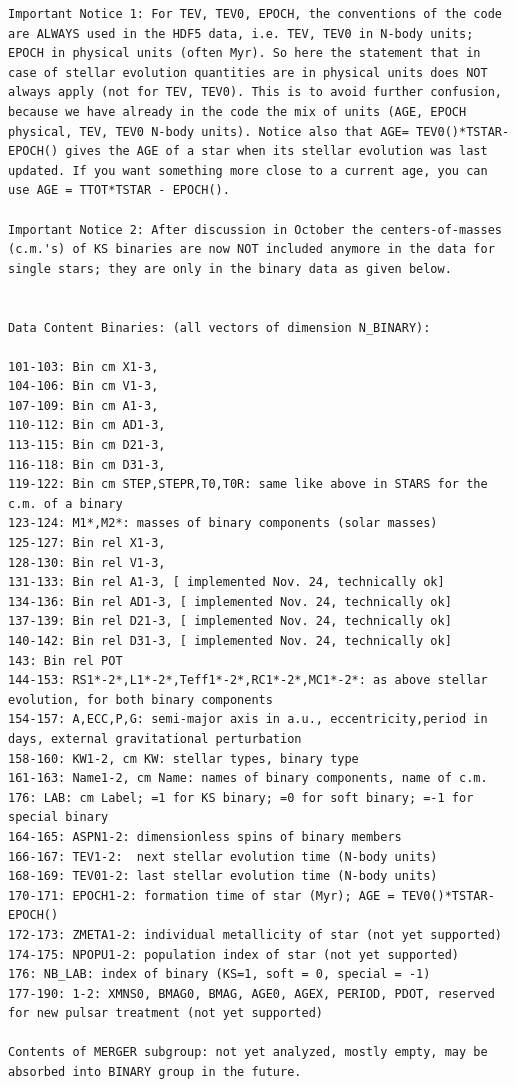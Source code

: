 \begin{lstlisting}[breaklines]
Important Notice 1: For TEV, TEV0, EPOCH, the conventions of the code are ALWAYS used in the HDF5 data, i.e. TEV, TEV0 in N-body units; EPOCH in physical units (often Myr). So here the statement that in case of stellar evolution quantities are in physical units does NOT always apply (not for TEV, TEV0). This is to avoid further confusion, because we have already in the code the mix of units (AGE, EPOCH physical, TEV, TEV0 N-body units). Notice also that AGE= TEV0()*TSTAR-EPOCH() gives the AGE of a star when its stellar evolution was last updated. If you want something more close to a current age, you can use AGE = TTOT*TSTAR - EPOCH().

Important Notice 2: After discussion in October the centers-of-masses (c.m.'s) of KS binaries are now NOT included anymore in the data for single stars; they are only in the binary data as given below.


Data Content Binaries: (all vectors of dimension N_BINARY):

101-103: Bin cm X1-3,
104-106: Bin cm V1-3,
107-109: Bin cm A1-3,
110-112: Bin cm AD1-3,
113-115: Bin cm D21-3,
116-118: Bin cm D31-3,
119-122: Bin cm STEP,STEPR,T0,T0R: same like above in STARS for the c.m. of a binary
123-124: M1*,M2*: masses of binary components (solar masses)
125-127: Bin rel X1-3,
128-130: Bin rel V1-3,
131-133: Bin rel A1-3, [ implemented Nov. 24, technically ok]
134-136: Bin rel AD1-3, [ implemented Nov. 24, technically ok]
137-139: Bin rel D21-3, [ implemented Nov. 24, technically ok]
140-142: Bin rel D31-3, [ implemented Nov. 24, technically ok]
143: Bin rel POT
144-153: RS1*-2*,L1*-2*,Teff1*-2*,RC1*-2*,MC1*-2*: as above stellar evolution, for both binary components
154-157: A,ECC,P,G: semi-major axis in a.u., eccentricity,period in days, external gravitational perturbation
158-160: KW1-2, cm KW: stellar types, binary type
161-163: Name1-2, cm Name: names of binary components, name of c.m.
176: LAB: cm Label; =1 for KS binary; =0 for soft binary; =-1 for special binary
164-165: ASPN1-2: dimensionless spins of binary members
166-167: TEV1-2:  next stellar evolution time (N-body units)
168-169: TEV01-2: last stellar evolution time (N-body units)
170-171: EPOCH1-2: formation time of star (Myr); AGE = TEV0()*TSTAR-EPOCH()
172-173: ZMETA1-2: individual metallicity of star (not yet supported)
174-175: NPOPU1-2: population index of star (not yet supported)
176: NB_LAB: index of binary (KS=1, soft = 0, special = -1)
177-190: 1-2: XMNS0, BMAG0, BMAG, AGE0, AGEX, PERIOD, PDOT, reserved for new pulsar treatment (not yet supported)

Contents of MERGER subgroup: not yet analyzed, mostly empty, may be absorbed into BINARY group in the future. 
\end{lstlisting}
